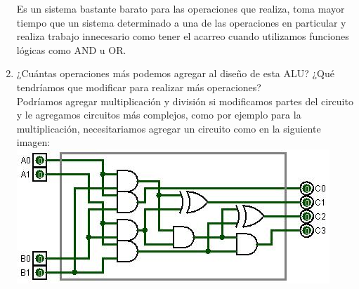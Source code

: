 \documentclass{article}
\begin{document}
\begin{enumerate}
Es un sistema bastante barato para las operaciones que realiza, toma mayor tiempo que un sistema determinado a una de las operaciones en particular y realiza trabajo innecesario como tener el acarreo cuando utilizamos funciones lógicas como AND u OR.\\


		\item
		¿Cuántas operaciones más podemos agregar al diseño de esta ALU? ¿Qué
tendríamos que modificar para realizar más operaciones?\\

		Podríamos agregar multiplicación y división si modificamos partes del circuito y le agregamos circuitos más complejos, como por ejemplo para la multiplicación, necesitariamos agregar un circuito como en la siguiente imagen:\\
		
		\includegraphics[scale=0.5]{Multiplicador.jpg}
		          
            
    \end{enumerate}
  
    
    
\end{document}
